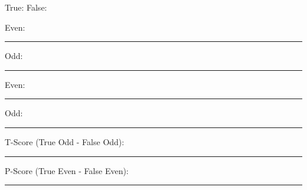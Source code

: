 \documentclass[letterpaper, 12pt]{article}
\begin{document}
\vspace{1in}
True: \hspace{4in} False:

Even: \rule{0.5in}{0.01in} Odd: \rule{0.5in}{0.01in} \hspace{2.45in} Even: \rule{0.5in}{0.01in} Odd: \rule{0.5in}{0.01in}
\vspace{.5in}


T-Score (True Odd - False Odd): \rule{0.5in}{0.01in}

\vspace{.5in}
P-Score (True Even - False Even): \rule{0.5in}{0.01in}



 
\end{document}
